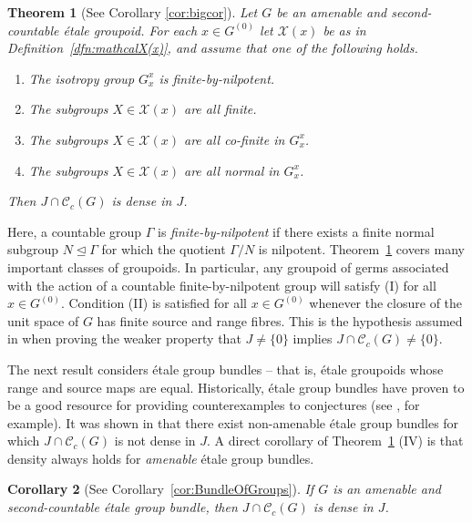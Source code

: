 \documentclass[11pt, oneside, reqno]{amsart}
\newcommand{\Gu}{G^{(0)}}
\newcommand{\cg}{\mathscr{C}_c(G)}
\newtheorem{introthm}{Theorem}
\newtheorem{introcor}[introthm]{Corollary}
\theoremstyle{definition}
\theoremstyle{remark}
\numberwithin{equation}{section}
\begin{document}
\begin{introthm}[See Corollary \ref{cor:bigcor}]\label{Intro:bigthm}
    Let $G$ be an amenable and second-countable \'etale groupoid. For each $x\in \Gu$ let $\mathcal{X}(x)$ be as in Definition~\ref{dfn:mathcalX(x)}, and assume that one of the following holds.
    \begin{enumerate}[label=(\Roman*)]
        \item The isotropy group $G_{x}^{x}$ is finite-by-nilpotent.
        \item The subgroups $X\in \mathcal{X}(x)$ are all finite.
        \item The subgroups $X\in \mathcal{X}(x)$ are all co-finite in $G_{x}^{x}$.
        \item The subgroups $X \in \mathcal{X}(x)$ are all normal in $G^x_x$.
    \end{enumerate}
    Then $J \cap \cg$ is dense in $J$.
\end{introthm}

Here, a countable group $\Gamma$ is \emph{finite-by-nilpotent} if there exists a finite normal subgroup $N \trianglelefteq \Gamma$ for which the quotient $\Gamma/N$ is nilpotent. Theorem~\ref{Intro:bigthm} covers many important classes of groupoids. In particular, any groupoid of germs associated with the action of a countable finite-by-nilpotent group will satisfy (I) for all $x \in \Gu$. Condition (II) is satisfied for all $x \in \Gu$ whenever the closure of the unit space of $G$ has finite source and range fibres. This is the hypothesis assumed in \cite[Theorem~C]{BGHL} when proving the weaker property that $J\neq \{0\}$ implies $J\cap\mathscr{C}_{c}(G)\neq \{0\}.$

\vspace{0.3cm}

The next result considers \'etale group bundles -- that is, \'etale groupoids whose range and source maps are equal. Historically, \'etale group bundles have proven to be a good resource for providing counterexamples to conjectures (see \cite{HLS}, \cite{Wil15} for example). It was shown in \cite{MS25} that there exist non-amenable \'etale group bundles for which $J \cap \cg$ is not dense in $J$. A direct corollary of Theorem~\ref{Intro:bigthm} (IV) is that density always holds for \emph{amenable} \'etale group bundles.

\begin{introcor}[See Corollary~\ref{cor:BundleOfGroups}]
    If $G$ is an amenable and second-countable \'etale group bundle, then $J \cap \cg$ is dense in $J$.
\end{introcor}
\end{document}
